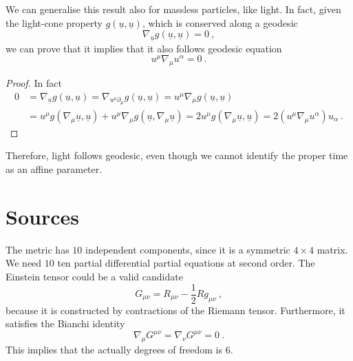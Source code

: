     We can generalise this result also for massless particles, like light. In fact, given the light-cone property $g(\underline u, \underline u)$, which is conserved along a geodesic
    \begin{equation*}
        \nabla_{\underline u} g(\underline u, \underline u) = 0 ~,
    \end{equation*}
    we can prove that it implies that it also follows geodesic equation
    \begin{equation*}
        u^\mu \nabla_\mu u^\alpha = 0 ~.
    \end{equation*}
    \begin{proof}
        In fact 
        \begin{equation*}
        \begin{aligned}
            0 & = \nabla_{\underline u} g(\underline u, \underline u) = \nabla_{u^\mu \partial_\mu} g(\underline u, \underline u) = u^\mu \nabla_\mu g(\underline u, \underline u) \\ & = u^\mu g( \nabla_\mu \underline u, \underline u) + u^\mu \nabla_\mu g(\underline u, \nabla_\mu \underline u) = 2 u^\mu g(\nabla_\mu \underline u, \underline u) = 2 (u^\mu \nabla_\mu u^\alpha) u_\alpha  ~.
        \end{aligned}
        \end{equation*}
    \end{proof}

    \noindent Therefore, light follows geodesic, even though we cannot identify the proper time as an affine parameter. 

\section{Sources}

    The metric has $10$ independent components, since it is a symmetric $4 \times 4$ matrix. We need $10$ ten partial differential partial equations at second order. The Einstein tensor could be a valid candidate
    \begin{equation*}
        G_{\mu\nu} = R_{\mu\nu} - \frac{1}{2} R g_{\mu\nu} ~,
    \end{equation*}
    because it is constructed by contractions of the Riemann tensor. Furthermore, it satisfies the Bianchi identity
    \begin{equation*}
        \nabla_\mu G^{\mu\nu} = \nabla_\nu G^{\mu\nu} = 0 ~.
    \end{equation*}
    This implies that the actually degrees of freedom is $6$. 

